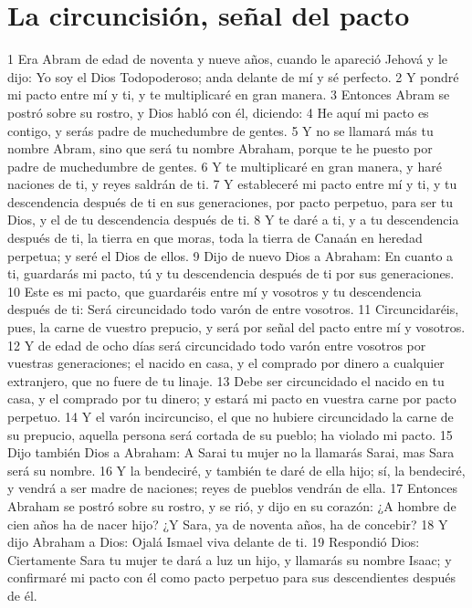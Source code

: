 \section{La circuncisión, señal del pacto}

1 Era Abram de edad de noventa y nueve años, cuando le apareció Jehová y le dijo: Yo soy el Dios Todopoderoso; anda delante de mí y sé perfecto.
2 Y pondré mi pacto entre mí y ti, y te multiplicaré en gran manera.
3 Entonces Abram se postró sobre su rostro, y Dios habló con él, diciendo:
4 He aquí mi pacto es contigo, y serás padre de muchedumbre de gentes.
5 Y no se llamará más tu nombre Abram, sino que será tu nombre Abraham, porque te he puesto por padre de muchedumbre de gentes.
6 Y te multiplicaré en gran manera, y haré naciones de ti, y reyes saldrán de ti.
7 Y estableceré mi pacto entre mí y ti, y tu descendencia después de ti en sus generaciones, por pacto perpetuo, para ser tu Dios, y el de tu descendencia después de ti.
8 Y te daré a ti, y a tu descendencia después de ti, la tierra en que moras, toda la tierra de Canaán en heredad perpetua; y seré el Dios de ellos.
9 Dijo de nuevo Dios a Abraham: En cuanto a ti, guardarás mi pacto, tú y tu descendencia después de ti por sus generaciones.
10 Este es mi pacto, que guardaréis entre mí y vosotros y tu descendencia después de ti: Será circuncidado todo varón de entre vosotros.
11 Circuncidaréis, pues, la carne de vuestro prepucio, y será por señal del pacto entre mí y vosotros.
12 Y de edad de ocho días será circuncidado todo varón entre vosotros por vuestras generaciones; el nacido en casa, y el comprado por dinero a cualquier extranjero, que no fuere de tu linaje.
13 Debe ser circuncidado el nacido en tu casa, y el comprado por tu dinero; y estará mi pacto en vuestra carne por pacto perpetuo.
14 Y el varón incircunciso, el que no hubiere circuncidado la carne de su prepucio, aquella persona será cortada de su pueblo; ha violado mi pacto.
15 Dijo también Dios a Abraham: A Sarai tu mujer no la llamarás Sarai, mas Sara será su nombre.
16 Y la bendeciré, y también te daré de ella hijo; sí, la bendeciré, y vendrá a ser madre de naciones; reyes de pueblos vendrán de ella.
17 Entonces Abraham se postró sobre su rostro, y se rió, y dijo en su corazón: ¿A hombre de cien años ha de nacer hijo? ¿Y Sara, ya de noventa años, ha de concebir?
18 Y dijo Abraham a Dios: Ojalá Ismael viva delante de ti.
19 Respondió Dios: Ciertamente Sara tu mujer te dará a luz un hijo, y llamarás su nombre Isaac; y confirmaré mi pacto con él como pacto perpetuo para sus descendientes después de él.
